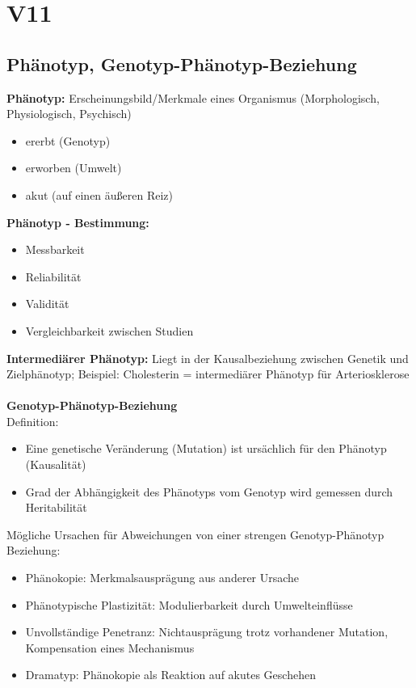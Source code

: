 \section{V11}
\subsection{Phänotyp, Genotyp-Phänotyp-Beziehung}
\textbf{Phänotyp:} Erscheinungsbild/Merkmale eines Organismus (Morphologisch, Physiologisch, Psychisch)
\begin{itemize}
	\item ererbt (Genotyp)
	\item erworben (Umwelt)
	\item akut (auf einen äußeren Reiz)
\end{itemize}

\textbf{Phänotyp - Bestimmung:}
\begin{itemize}
	\item Messbarkeit
	\item Reliabilität
	\item Validität
	\item Vergleichbarkeit zwischen Studien
\end{itemize}

\textbf{Intermediärer Phänotyp:} Liegt in der Kausalbeziehung zwischen Genetik und Zielphänotyp; Beispiel: Cholesterin = intermediärer Phänotyp für Arteriosklerose
\\\\
\textbf{Genotyp-Phänotyp-Beziehung}\\
Definition:
\begin{itemize}
	\item Eine genetische Veränderung (Mutation) ist ursächlich für den Phänotyp (Kausalität)
	\item Grad der Abhängigkeit des Phänotyps vom Genotyp wird gemessen durch Heritabilität
\end{itemize}
Mögliche Ursachen für Abweichungen von einer strengen Genotyp-Phänotyp Beziehung:
\begin{itemize}
	\item Phänokopie: Merkmalsausprägung aus anderer Ursache
	\item Phänotypische Plastizität: Modulierbarkeit durch Umwelteinflüsse
	\item Unvollständige Penetranz: Nichtausprägung trotz vorhandener Mutation, Kompensation eines Mechanismus
	\item Dramatyp: Phänokopie als Reaktion auf akutes Geschehen
\end{itemize}

